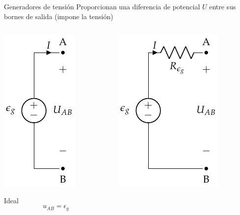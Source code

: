\documentclass[aspectratio=169, xcolor={usenames,svgnames,dvipsnames}]{beamer}
\begin{document}
\begin{frame}{Generadores de tensión}
Proporcionan una diferencia de potencial $U$ entre sus bornes de salida (\alert{impone la tensión})
\begin{columns}
\begin{column}{0.3\columnwidth}
\begin{center}
\includegraphics[height=0.5\textheight]{../figs/FuenteTensionIdealDC.pdf}

\alert{Ideal}
\begin{equation*}
    u_{AB}=\epsilon_g
\end{equation*}
\end{center}
\end{column}
\begin{column}{0.3\columnwidth}
\begin{center}
\includegraphics[height=0.5\textheight]{../figs/FuenteTensionRealDC.pdf}


\end{center}
\end{column}
\end{columns}
\end{frame}
\end{document}
